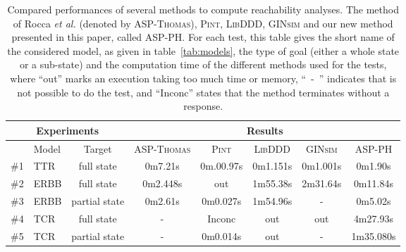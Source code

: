 \begin{table}[ht]
\begin{center}
\noindent%
\begin{tabular}{|l|l|c||c|c|c|c|c|}
\hline
  \multicolumn{3}{|c||}{Experiments} & \multicolumn{5}{c|}{Results} \\
\hline
  & Model & Target & \textsc{ASP-Thomas} & \textsc{Pint} & \textsc{LibDDD} & \textsc{GINsim} & \textsc{ASP-PH} \\
\hline
\hline
  \#1 & TTR & full state & 0m7.21s & 0m.00.97s & 0m1.151s &  0m1.001s & 0m1.90s \\
\hline
  \#2 & ERBB & full state & 0m2.448s & out &1m55.38s & 2m31.64s & 0m11.84s \\
\hline
  \#3 & ERBB & partial state & 0m2.61s & 0m0.027s &1m54.96s & - & 0m5.02s \\
\hline
  \#4 & TCR & full state & - & Inconc & out & out & 4m27.93s \\
\hline
  \#5 & TCR & partial state & - & 0m0.014s & out & - & 1m35.080s \\
\hline
\end{tabular}
\caption{\label{tab:reachability}%
Compared performances of several methods to compute reachability analyses.
The method of Rocca \textit{et al.} (denoted by \textsc{ASP-Thomas}), \textsc{Pint}, \textsc{LibDDD}, \textsc{GINsim} and our new method presented in this paper, called \textsc{ASP-PH}.
For each test, this table gives the short name of the considered model,
as given in table~\ref{tab:models},
the type of goal (either a whole state or a sub-state)
and the computation time of the different methods used for the tests,
where “out” marks an execution taking too much time or memory,
\mbox{“~-~”} indicates that is not possible to do the test,
and “Inconc” states that the method terminates without a response.
}
\end{center}
\end{table}

